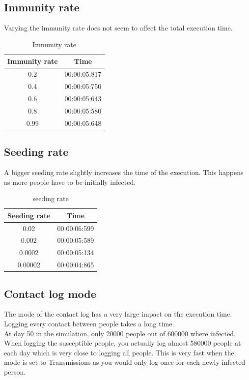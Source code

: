 \documentclass[runningheads]{llncs}
\begin{document}
\subsection{Immunity rate}
Varying the immunity rate does not seem to affect the total execution time.
\begin{table}[!h]
	\centering
	\begin{tabular}{|c|c|}
		\hline
		Immunity rate & Time \\\hline
    	0.2  & 00:00:05:817 \\\hline
    	0.4  & 00:00:05:750 \\\hline
    	0.6  & 00:00:05:643 \\\hline
    	0.8  & 00:00:05:580 \\\hline
    	0.99 & 00:00:05:648 \\
    	\hline
	\end{tabular}
	\caption{Immunity rate}
\end{table}

\subsection{Seeding rate}
A bigger seeding rate slightly increases the time of the execution. This happens as more people have to be initially infected.
\begin{table}[!h]
	\centering
	\begin{tabular}{|c|c|}
		\hline
		Seeding rate & Time \\\hline
    	0.02 	& 00:00:06:599 \\\hline
    	0.002 	& 00:00:05:589 \\\hline
    	0.0002 	& 00:00:05:134 \\\hline
  		0.00002 & 00:00:04:865 \\
    	\hline
	\end{tabular}
	\caption{seeding rate}
\end{table}

\subsection{Contact log mode}
The mode of the contact log has a very large impact on the execution time. Logging every contact between people takes a long time.\\
At day 50 in the simulation, only 20000 people out of 600000 where infected. When logging the susceptible people, you actually log almost 580000 people at each day which is very close to logging all people. This is very fast when the mode is set to Transmissions as you would only log once for each newly infected person.\\
\end{document}
